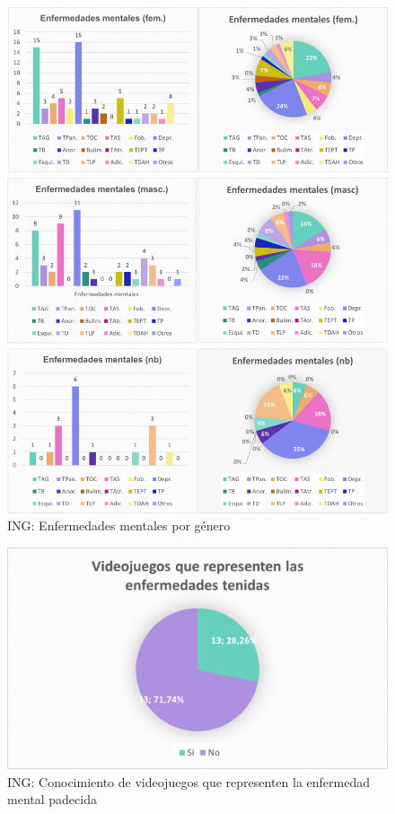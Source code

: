\documentclass[12pt, a4paper,twoside,titlepage]{book}
\begin{document}
\begin{figure}
    \centering
    \includegraphics[width=1\linewidth]{ANEXO ING/25AnexINGEnfgene}
    \caption{ING: Enfermedades mentales por género}
      \label{fig:INGTenidasgen}
\end{figure}

\begin{figure}
    \centering
    \includegraphics[width=.8\linewidth]{ANEXO ING/25AnexINGEnften}
    \caption{ING: Conocimiento de videojuegos que representen la enfermedad mental padecida}
    \label{fig:INGVidenf}
\end{figure}
\end{document}
